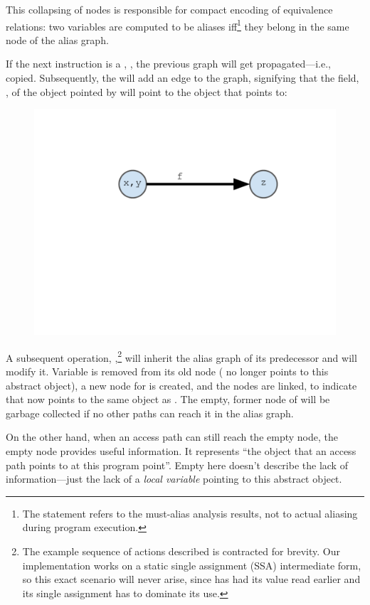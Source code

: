 This collapsing of nodes is responsible for compact encoding of equivalence relations: two variables are computed to be aliases iff\footnote{The statement refers to the must-alias analysis results, not to actual aliasing during program execution.} they belong in the same node of the alias graph.

If the next instruction is a , , the previous graph will get propagated---i.e., copied. Subsequently, the  will add an edge to the graph, signifying that the field, , of the object pointed by  will point to the object that  points to:

\begin{figure}[ht]
\centering
\includegraphics[trim={35mm 115mm 35mm 51mm},clip,width=0.8\linewidth]{assets/must-data/alias-graph2.pdf}
\end{figure}

A subsequent  operation, ,\footnote{The example sequence of actions described is contracted for brevity. Our implementation works on a static single assignment (SSA) intermediate form, so this exact scenario will never arise, since  has had its value read earlier and its single assignment has to dominate its use.} will inherit the alias graph of its predecessor and will modify it. Variable  is removed from its old node ( no longer points to this abstract object), a new node for  is created, and the nodes are linked, to indicate that  now points to the same object as . The empty, former node of  will be garbage collected if no other paths can reach it in the alias graph.

On the other hand, when an access path can still reach the empty node, the empty node provides useful information. It represents ``the object that an access path points to at this program point''. Empty here doesn't describe the lack of information---just the lack of a \emph{local variable} pointing to this abstract object.

